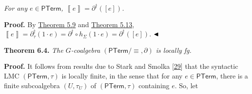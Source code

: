 \hypertarget{html:S6.Thmtheorem3.p1}{} \emph{For any %
\hypertarget{html:S6.Thmtheorem3.p1.m1}{}\({e\in\mathsf{PTerm}}\), %
\hypertarget{html:S6.Thmtheorem3.p1.m2}{}\({\left\llbracket{e}\right\rrbracket=\partial^{\dagger}([e])}\).}
\par\medskip
\hypertarget{html:S6.SS0.SSS0.P0.SPx2}{} \par\noindent\textbf{Proof.}\quad  %
\hypertarget{html:S6.SS0.SSS0.P0.SPx2.p1}{} By \hyperlink{html:S5.Thmtheorem9}{Theorem 5.9} and \hyperlink{html:S5.Thmtheorem13}{Theorem 5.13}, %
\hypertarget{html:S6.SS0.SSS0.P0.SPx2.p1.m1}{}\({\left\llbracket{e}\right\rrbracket=\partial_{\tau}^{\dagger}(1\cdot e)=\partial^{\dagger}\circ h_{\Sigma}(1\cdot e)=\partial^{\dagger}([e])}\). %
\hypertarget{html:S6.SS0.SSS0.P0.SPx2.p1.m2}{}\({\hfill\blacktriangleleft}\)
\par\medskip
\hypertarget{html:S6.Thmtheorem4}{} \par\noindent\textbf{\textbf{Theorem 6.4}\textbf{.}}\quad  %
\hypertarget{html:S6.Thmtheorem4.p1}{} \emph{The %
\hypertarget{html:S6.Thmtheorem4.p1.m1}{}\({G}\)-coalgebra %
\hypertarget{html:S6.Thmtheorem4.p1.m2}{}\({(\mathsf{PTerm}/{\equiv},\partial)}\) is locally fg.}
\par\medskip
\hypertarget{html:S6.SS0.SSS0.P0.SPx3}{} \par\noindent\textbf{Proof.}\quad  %
\hypertarget{html:S6.SS0.SSS0.P0.SPx3.p1}{} It follows from results due to Stark and Smolka [\hyperlink{html:bib.bib29}{29}] that the syntactic LMC %
\hypertarget{html:S6.SS0.SSS0.P0.SPx3.p1.m1}{}\({(\mathsf{PTerm},\tau)}\) is locally finite, in the sense that for any %
\hypertarget{html:S6.SS0.SSS0.P0.SPx3.p1.m2}{}\({e\in\mathsf{PTerm}}\), there is a finite subcoalgebra %
\hypertarget{html:S6.SS0.SSS0.P0.SPx3.p1.m3}{}\({(U,\tau_{U})}\) of %
\hypertarget{html:S6.SS0.SSS0.P0.SPx3.p1.m4}{}\({(\mathsf{PTerm},\tau)}\) containing %
\hypertarget{html:S6.SS0.SSS0.P0.SPx3.p1.m5}{}\({e}\). So, let %
